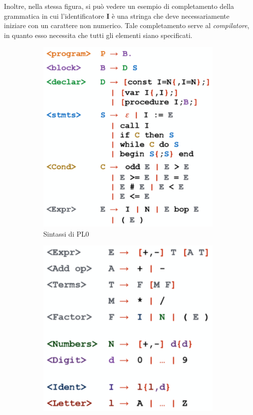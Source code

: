 \documentclass[a4paper,oneside,titlepage]{book}
\begin{document}
Inoltre, nella stessa figura, si può vedere un esempio di completamento della grammatica in cui l'identificatore \textbf{I} è una stringa che deve necessariamente iniziare con un carattere non numerico. Tale completamento serve al \textit{compilatore}, in quanto esso necessita che tutti gli elementi siano specificati.
\begin{figure}[htp]
	\begin{subfigure}{0.49\textwidth}
		\includegraphics[width=\textwidth, height=\textheight, keepaspectratio]{pl01.png} 
		\caption{Sintassi di PL0}
	\end{subfigure}
	\hfill
	\begin{subfigure}{0.49\textwidth}
		\includegraphics[width=\textwidth, height=\textheight, keepaspectratio]{pl02.png}

\end{subfigure}
\end{figure}
\end{document}

